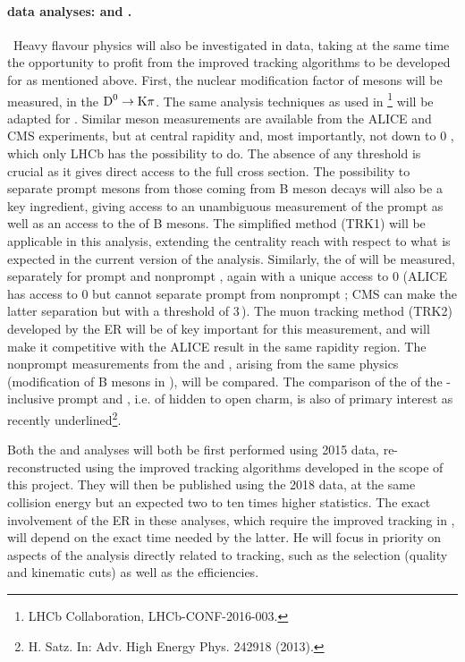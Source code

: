 \documentclass[a4paper,11pt]{article}
\newcommand{\ER}{ER\xspace}
\begin{document}
\paragraph{\pbpb data analyses: \Dz and \Jpsi. }\ 
Heavy flavour physics will also be investigated in \pbpb data, taking at the same time the opportunity to profit from the improved tracking algorithms to be developed for \pbpb as mentioned above. 
%
First, the nuclear modification factor of \Dz mesons will be measured, in the $\text{D}^0 \to \text{K}\pi$. The same analysis techniques as used in \pPb\footnote{LHCb Collaboration, LHCb-CONF-2016-003.} will be adapted for \pbpb. Similar \Dz meson measurements are available from the ALICE and CMS experiments, but at central rapidity and, most importantly, not down to 0 \pt, which only LHCb has the possibility to do. The absence of any \pt threshold is crucial as it gives direct access to the full cross section. The possibility to separate
prompt \Dz mesons from those coming from B meson decays will also be a key ingredient, giving access to an unambiguous measurement of the prompt \Dz as well as an access to the \raa
of B mesons. The simplified method (TRK1) will be applicable in this analysis, extending the centrality reach with respect to what is expected in the current version of the analysis.
%
Similarly, the \raa of \Jpsi will be measured, separately for prompt and nonprompt \Jpsi, again with a unique access to 0 \pt (ALICE has access to 0 \pt \Jpsi but cannot separate prompt from nonprompt \Jpsi; CMS can make the latter separation but with a \pt threshold of 3\,\GeVc). 
The muon tracking method (TRK2) developed by the  \ER will be of key important for this \JPsi measurement, and will make it competitive with the ALICE result in the same rapidity region.
The nonprompt measurements from the \Dz and \Jpsi, arising from the same physics (modification of B mesons in \pbpb), will be compared. The comparison of the \raa of the \pt-inclusive prompt \Jpsi and \Dz, i.e. of hidden to open charm, is also of primary interest as recently underlined\footnote{H. Satz. In: Adv. High Energy Phys. 242918 (2013).}.

Both the \Dz and \Jpsi analyses will both be first performed using 2015 \pbpb data, re-reconstructed using the improved tracking algorithms developed in the scope of this project. They will then be published using the 2018 data, at the same collision energy but an expected two to ten times higher statistics. The exact involvement of the \ER in these analyses, which require the improved tracking in \pbpb, will depend on the exact time needed by the latter. He will focus in priority on aspects of the analysis directly related to tracking, such as the selection (quality and kinematic cuts) as well as the efficiencies.
\end{document}
